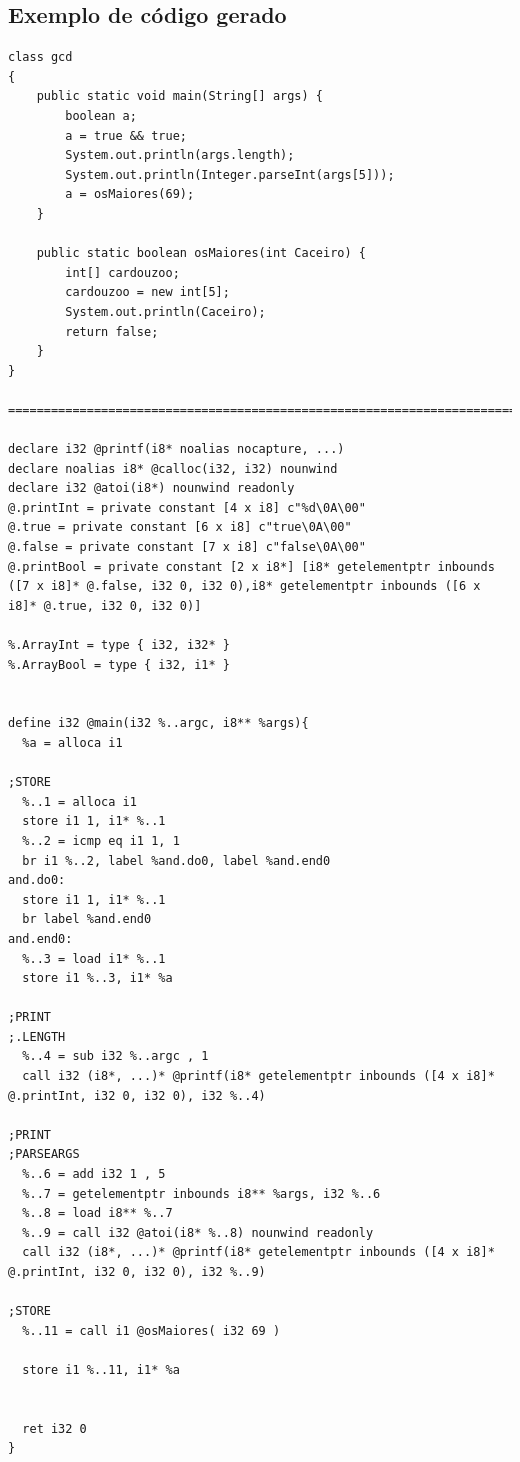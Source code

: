 \documentclass[12pt]{article}
\begin{document}
\subsection{Exemplo de código gerado}

\begin{lstlisting}
class gcd
{
	public static void main(String[] args) {
		boolean a;
		a = true && true;
		System.out.println(args.length);
		System.out.println(Integer.parseInt(args[5]));
		a = osMaiores(69);
	}

	public static boolean osMaiores(int Caceiro) {
		int[] cardouzoo;
		cardouzoo = new int[5];
		System.out.println(Caceiro);
		return false;
	}
}

==============================================================================

declare i32 @printf(i8* noalias nocapture, ...)
declare noalias i8* @calloc(i32, i32) nounwind
declare i32 @atoi(i8*) nounwind readonly
@.printInt = private constant [4 x i8] c"%d\0A\00"
@.true = private constant [6 x i8] c"true\0A\00"
@.false = private constant [7 x i8] c"false\0A\00"
@.printBool = private constant [2 x i8*] [i8* getelementptr inbounds ([7 x i8]* @.false, i32 0, i32 0),i8* getelementptr inbounds ([6 x i8]* @.true, i32 0, i32 0)]

%.ArrayInt = type { i32, i32* }
%.ArrayBool = type { i32, i1* }


define i32 @main(i32 %..argc, i8** %args){
  %a = alloca i1

;STORE
  %..1 = alloca i1
  store i1 1, i1* %..1
  %..2 = icmp eq i1 1, 1
  br i1 %..2, label %and.do0, label %and.end0
and.do0:
  store i1 1, i1* %..1
  br label %and.end0
and.end0:
  %..3 = load i1* %..1
  store i1 %..3, i1* %a

;PRINT
;.LENGTH
  %..4 = sub i32 %..argc , 1
  call i32 (i8*, ...)* @printf(i8* getelementptr inbounds ([4 x i8]* @.printInt, i32 0, i32 0), i32 %..4)

;PRINT
;PARSEARGS
  %..6 = add i32 1 , 5
  %..7 = getelementptr inbounds i8** %args, i32 %..6
  %..8 = load i8** %..7
  %..9 = call i32 @atoi(i8* %..8) nounwind readonly
  call i32 (i8*, ...)* @printf(i8* getelementptr inbounds ([4 x i8]* @.printInt, i32 0, i32 0), i32 %..9)

;STORE
  %..11 = call i1 @osMaiores( i32 69 )

  store i1 %..11, i1* %a


  ret i32 0
}



\end{lstlisting}
\end{document}
